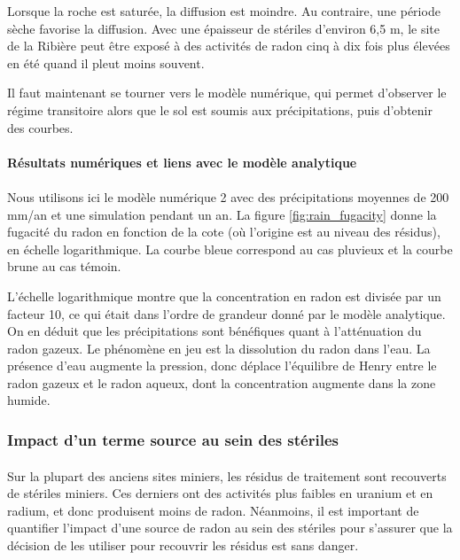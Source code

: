 \documentclass{article}
\begin{document}
Lorsque la roche est saturée, la diffusion est moindre. Au contraire, une période sèche favorise la diffusion. Avec une épaisseur de stériles d'environ 6,5 m, le site de la Ribière peut être exposé à des activités de radon cinq à dix fois plus élevées en été quand il pleut moins souvent.

Il faut maintenant se tourner vers le modèle numérique, qui permet d’observer le régime transitoire alors que le sol est soumis aux précipitations, puis d'obtenir des courbes.

\paragraph{Résultats numériques et liens avec le modèle analytique}

\paragraph{} Nous utilisons ici le modèle numérique 2 avec des précipitations moyennes de 200 mm/an et une simulation pendant un an. La figure \ref{fig:rain_fugacity} donne la fugacité du radon en fonction de la cote (où l'origine est au niveau des résidus), en échelle logarithmique. La courbe bleue correspond au cas pluvieux et la courbe brune au cas témoin.

L’échelle logarithmique montre que la concentration en radon est divisée par un facteur 10, ce qui était dans l'ordre de grandeur donné par le modèle analytique. On en déduit que les précipitations sont bénéfiques quant à l’atténuation du radon gazeux. Le phénomène en jeu est la dissolution du radon dans l’eau. La présence d’eau augmente la pression, donc déplace l’équilibre de Henry entre le radon gazeux et le radon aqueux, dont la concentration augmente dans la zone humide.

\newpage
\subsubsection{Impact d'un terme source au sein des stériles}

\paragraph{} Sur la plupart des anciens sites miniers, les résidus de traitement sont recouverts de stériles miniers. Ces derniers ont des activités plus faibles en uranium et en radium, et donc produisent moins de radon. Néanmoins, il est important de quantifier l'impact d'une source de radon au sein des stériles pour s'assurer que la décision de les utiliser pour recouvrir les résidus est sans danger.
\end{document}
